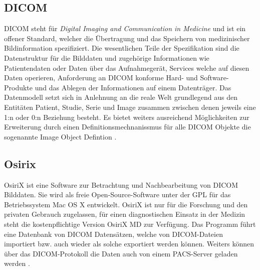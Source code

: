 \subsection{DICOM}
\label{sec:DICOM}
DICOM steht für \emph{Digital Imaging and Communication in Medicine} und ist ein offener Standard, 
welcher die Übertragung und das Speichern von medizinischer Bildinformation spezifiziert.
Die wesentlichen Teile der Spezifikation sind die Datenstruktur für die Bilddaten und zugehörige Informationen wie Patientendaten oder Daten über das Aufnahmegerät, 
Services welche auf diesen Daten operieren, Anforderung an DICOM konforme Hard- und Software-Produkte und das Ablegen der Informationen auf einem Datenträger.
Das Datenmodell setzt sich in Anlehnung an die reale Welt grundlegend aus den Entitäten Patient, Studie, Serie und Image zusammen zwischen denen jeweils eine 1:n oder 0:n Beziehung besteht.
Es bietet weiters ausreichend Möglichkeiten zur Erweiterung durch einen Definitionsmechnanissmus für alle DICOM Objekte die sogenannte Image Object Defintion \cite{pacs}.

\subsection{Osirix}
\label{sec:Osirix}
OsiriX ist eine Software zur Betrachtung und Nachbearbeitung von DICOM Bilddaten.
Sie wird als freie Open-Source-Software unter der GPL für das Betriebssystem Mac OS X entwickelt.
OsiriX ist nur für die Forschung und den privaten Gebrauch zugelassen, 
für einen diagnostischen Einsatz in der Medizin steht die kostenpflichtige Version OsiriX MD zur Verfügung.
%
Das Programm führt eine Datenbank von DICOM Datensätzen, 
welche von DICOM-Dateien importiert bzw. auch wieder als solche exportiert werden können.
Weiters können über das DICOM-Protokoll die Daten auch von einem PACS-Server geladen werden \cite{osirix}.


